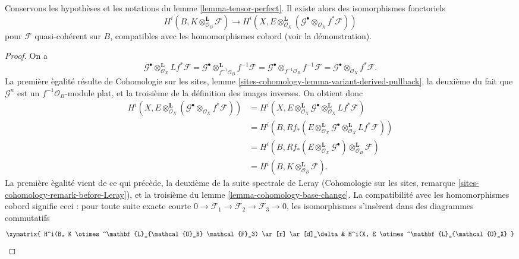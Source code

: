 \begin{lemma}
\label{lemma-compute-tensor-perfect}
Conservons les hypoth\`eses et les notations du lemme
\ref{lemma-tensor-perfect}. Il existe alors des isomorphismes fonctoriels
$$
H^i(B, K \otimes^\mathbf{L}_{\mathcal{O}_B} \mathcal{F})
\longrightarrow
H^i(X, E \otimes^\mathbf{L}_{\mathcal{O}_X}
(\mathcal{G}^\bullet \otimes_{\mathcal{O}_X} f^*\mathcal{F}))
$$
pour $\mathcal{F}$ quasi-coh\'erent sur $B$, compatibles avec les homomorphismes
cobord (voir la d\'emonstration).
\end{lemma}

\begin{proof}
On a
$$
\mathcal{G}^\bullet \otimes_{\mathcal{O}_X}^\mathbf{L} Lf^*\mathcal{F} =
\mathcal{G}^\bullet \otimes_{f^{-1}\mathcal{O}_B}^\mathbf{L} f^{-1}\mathcal{F} =
\mathcal{G}^\bullet \otimes_{f^{-1}\mathcal{O}_B} f^{-1}\mathcal{F} =
\mathcal{G}^\bullet \otimes_{\mathcal{O}_X} f^*\mathcal{F}.
$$
La premi\`ere \`egalit\'e r\'esulte de Cohomologie sur les sites, lemme
\ref{sites-cohomology-lemma-variant-derived-pullback}, la deuxi\`eme du fait que
$\mathcal{G}^n$ est un $f^{-1}\mathcal{O}_B$-module plat, et la troisi\`eme de
la d\'efinition des images inverses. On obtient donc
\begin{align*}
H^i(X, E \otimes^\mathbf{L}_{\mathcal{O}_X}
(\mathcal{G}^\bullet \otimes_{\mathcal{O}_X} f^*\mathcal{F}))
& =
H^i(X, E \otimes^\mathbf{L}_{\mathcal{O}_X} \mathcal{G}^\bullet
\otimes_{\mathcal{O}_X}^\mathbf{L} Lf^*\mathcal{F}) \\
& =
H^i(B,
Rf_*(E \otimes^\mathbf{L}_{\mathcal{O}_X} \mathcal{G}^\bullet
\otimes^\mathbf{L}_{\mathcal{O}_X} Lf^*\mathcal{F})) \\
& =
H^i(B,
Rf_*(E \otimes^\mathbf{L}_{\mathcal{O}_X} \mathcal{G}^\bullet)
\otimes^\mathbf{L}_{\mathcal{O}_B} \mathcal{F}) \\
& =
H^i(B, K \otimes^\mathbf{L}_{\mathcal{O}_B} \mathcal{F}).
\end{align*}
La premi\`ere \`egalit\'e vient de ce qui pr\'ec\`ede, la deuxi\`eme de la suite
spectrale de Leray (Cohomologie sur les sites, remarque
\ref{sites-cohomology-remark-before-Leray}), et la troisi\`eme du lemme
\ref{lemma-cohomology-base-change}. La compatibilit\'e avec les homomorphismes
cobord signifie ceci : pour toute suite exacte courte
$0\to\mathcal{F}_1\to\mathcal{F}_2\to\mathcal{F}_3\to0$, les isomorphismes
s'ins\`erent dans des diagrammes commutatifs
$$
\xymatrix{
H^i(B, K \otimes^\mathbf{L}_{\mathcal{O}_B} \mathcal{F}_3)
\ar[r] \ar[d]_\delta &
H^i(X, E \otimes^\mathbf{L}_{\mathcal{O}_X}
}$$
\end{proof}
